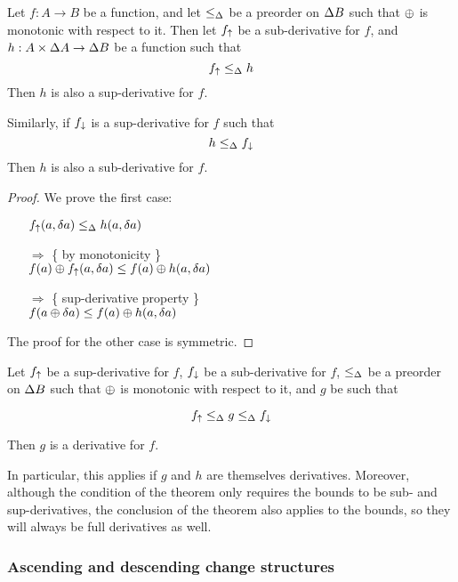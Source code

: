 \begin{thm}
  Let $f: A \rightarrow B$ be a function, and let $\leq_\Delta$ be a preorder on $\Delta B$ such that $\oplus$ is monotonic with
  respect to it. Then let $f_\uparrow$ be a sub-derivative for $f$, and $h: A \times
  \Delta A \rightarrow \Delta B$ be a function such that
  $$f_\uparrow \leq_\Delta h$$
  Then $h$ is also a sup-derivative for $f$.

  Similarly, if $f_\downarrow$ is a sup-derivative for $f$ such that 
  $$h \leq_\Delta f_\downarrow$$
  Then $h$ is also a sub-derivative for $f$.
\end{thm}
\begin{proof}
  We prove the first case:
  \begin{itemize}
    \item[ ]$f_\uparrow(a, \delta a) \leq_\Delta h(a, \delta a)$
    \item[$\Rightarrow$]\{ by monotonicity \}\\
      $f(a) \oplus f_\uparrow(a, \delta a) \leq f(a) \oplus h(a, \delta a)$
    \item[$\Rightarrow$]\{ sup-derivative property \}\\
      $f(a \oplus \delta a) \leq f(a) \oplus h(a, \delta a)$
  \end{itemize}

  The proof for the other case is symmetric.
\end{proof}

\begin{thm}
  \label{thm:sandwich}
  Let $f_\uparrow$ be a sup-derivative for $f$, $f_\downarrow$ be a sub-derivative for $f$, $\leq_\Delta$ be a preorder on $\Delta B$ such that $\oplus$ is monotonic with
  respect to it, and $g$ be such that

  $$f_\uparrow \leq_\Delta g \leq_\Delta f_\downarrow$$

  Then $g$ is a derivative for $f$.
\end{thm}

In particular, this applies if $g$ and $h$ are themselves derivatives. Moreover,
although the condition of the theorem only requires the bounds to be sub- and
sup-derivatives, the conclusion of the theorem also applies to the bounds, so
they will always be full derivatives as well.

\subsubsection{Ascending and descending change structures}

